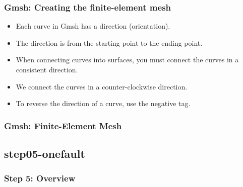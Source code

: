 \documentclass[aspectratio=169]{beamer}
\begin{document}
\begin{frame}
  \frametitle{Gmsh: Creating the finite-element mesh}
  \summary{}
  
  \begin{itemize}
  \item Each curve in Gmsh has a direction (orientation).
  \item The direction is from the starting point to the ending point.
  \item When connecting curves into surfaces, you must connect the curves in a consistent direction.
  \item We connect the curves in a counter-clockwise direction.
  \item To reverse the direction of a curve, use the negative tag.
  \end{itemize}
  
\end{frame}

\begin{frame}
  \frametitle{Gmsh: Finite-Element Mesh}

  
\end{frame}


\subsection{step05-onefault}

\begin{frame}
  \frametitle{Step 5: Overview}

      
\end{frame}
\end{document}
